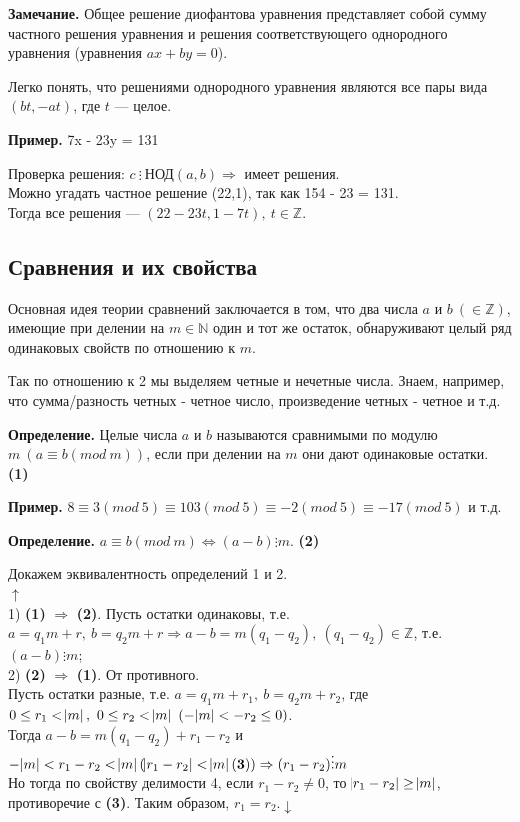 \documentclass{article}
\begin{document}
            \textbf{Замечание.} Общее решение диофантова уравнения представляет собой сумму частного решения уравнения и решения соответствующего однородного уравнения (уравнения \( ax + by = 0 \)).

            Легко понять, что решениями однородного уравнения являются все пары вида \( (bt, -at) \), где \( t \) --- целое.

            \textbf{Пример.} 7x - 23y = 131
            
            Проверка решения: \( c\ \vdots \ \textrm{НОД}(a,b) \Rightarrow \) имеет решения.\\ 
            Можно угадать частное решение (22,1), так как 154 - 23 = 131.\\
            Тогда все решения --- \( (22-23t,1-7t),\ t \in \mathbb{Z} \).

        \subsection{Сравнения и их свойства}
        	Основная идея теории сравнений заключается в том, что два числа \( a \) и \( b\ (\in \mathbb{Z}) \), имеющие при делении на \( m \in \mathbb{N} \) один и тот же остаток, обнаруживают целый ряд одинаковых свойств по отношению к \( m \).

            Так по отношению к 2 мы выделяем четные и нечетные числа. Знаем, например, что сумма/разность четных - четное число, произведение четных - четное и т.д.

            \textbf{Определение.} Целые числа \( a \) и \( b \) называются сравнимыми по модулю \( m\ (a \equiv b (mod\ m)) \), если при делении на \( m \) они дают одинаковые остатки. \textbf{(1)}

            \textbf{Пример.} \( 8 \equiv 3 (mod\ 5) \equiv 103 (mod\ 5) \equiv -2 (mod\ 5) \equiv -17 (mod\ 5) \) и т.д.

            \textbf{Определение.} \( a \equiv b (mod\ m) \Leftrightarrow (a - b) \vdots m \). \textbf{(2)}

            Докажем эквивалентность определений 1 и 2.\\
            \( \uparrow \)\\
            1) \textbf{(1)} \( \Rightarrow \) \textbf{(2)}. Пусть остатки одинаковы, т.е. \( a = q_1m + r,\ b = q_2m + r \Rightarrow a - b = m(q_1 - q_2),\ (q_1 - q_2) \in \mathbb{Z} \), т.е. \( (a - b) \vdots m \);\\
            2) \textbf{(2)} \( \Rightarrow \) \textbf{(1)}. От противного.\\
            Пусть остатки разные, т.е. \( a = q_1m + r_1,\ b = q_2m + r_2 \), где \( 0 \leq r_1 < \abs{m},\ 0 \leq r_2 < \abs{m}\ (-\abs{m} < -r_2 \leq 0) \).\\
            Тогда \( a - b = m(q_1 - q_2) + r_1 - r_2 \) и \( -\abs{m} < r_1 - r_2 < \abs{m} (\abs{r_1 - r_2} < \abs{m} \mathbf{(3)}) \Rightarrow (r_1 - r_2) \vdots m \)\\
            Но тогда по свойству делимости 4, если \( r_1 - r_2 \neq 0 \), то \( \abs{r_1 - r_2} \geq \abs{m} \), противоречие с \textbf{(3)}. Таким образом, \(r_1 = r_2. \downarrow \)
\end{document}
